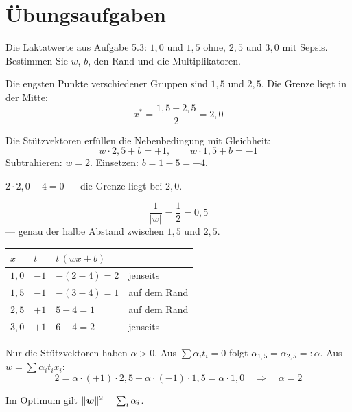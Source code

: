 \section{Übungsaufgaben}

\begin{aufgabe}
Die Laktatwerte aus Aufgabe 5.3: $1{,}0$ und $1{,}5$ ohne, $2{,}5$ und $3{,}0$ mit Sepsis. Bestimmen Sie $w$, $b$, den Rand und die Multiplikatoren.

\loesung
{}
Die engsten Punkte verschiedener Gruppen sind $1{,}5$ und $2{,}5$. Die Grenze liegt in der Mitte:
\[ x^{*} = \frac{1{,}5+2{,}5}{2} = 2{,}0 \]

Die Stützvektoren erfüllen die Nebenbedingung mit Gleichheit:
\[ w\cdot2{,}5 + b = +1, \qquad w\cdot1{,}5 + b = -1 \]
Subtrahieren: $w = 2$. Einsetzen: $b = 1 - 5 = -4$.

 $2\cdot2{,}0 - 4 = 0$ --- die Grenze liegt bei $2{,}0$. \checkmark

\[ \frac{1}{|w|} = \frac12 = 0{,}5 \]
--- genau der halbe Abstand zwischen $1{,}5$ und $2{,}5$. \checkmark

\begin{center}
{\small
\renewcommand{\arraystretch}{1.46}
\begin{tabular}{@{}P{1.4cm}P{1.0cm}P{2.6cm}P{2.4cm}@{}}
\toprule
$x$ & $t$ & $t\,(wx+b)$ & \\
\midrule
$1{,}0$ & $-1$ & $-(2-4) = 2$ & jenseits\\
$1{,}5$ & $-1$ & $-(3-4) = 1$ & \textcolor{akzent}{auf dem Rand}\\
$2{,}5$ & $+1$ & $5-4 = 1$ & \textcolor{akzent}{auf dem Rand}\\
$3{,}0$ & $+1$ & $6-4 = 2$ & jenseits\\
\bottomrule
\end{tabular}}
\end{center}

Nur die Stützvektoren haben $\alpha > 0$. Aus $\sum\alpha_i t_i = 0$ folgt $\alpha_{1{,}5} = \alpha_{2{,}5} =: \alpha$. Aus $w = \sum\alpha_i t_i x_i$:
\[ 2 = \alpha\cdot(+1)\cdot2{,}5 + \alpha\cdot(-1)\cdot1{,}5 = \alpha\cdot1{,}0 \quad\Longrightarrow\quad \alpha = 2 \]

Im Optimum gilt $\|\boldsymbol{w}\|^{2} = \sum_i\alpha_i$.


\end{aufgabe}
